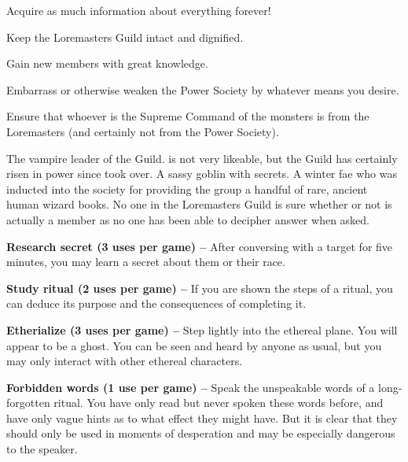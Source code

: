 \documentclass[blue]{guildcamp2}
\begin{document}
\begin{itemz}[Goals]
  \item Acquire as much information about everything forever!
  \item Keep the Loremasters Guild intact and dignified.
  \item Gain new members with great knowledge.
  \item Embarrass or otherwise weaken the Power Society by whatever means you desire.
  \item Ensure that whoever is the Supreme Command of the monsters is from the Loremasters (and certainly not from the Power Society).
\end{itemz}


\begin{members}
  \member{\cVampire{}} The vampire leader of the Guild. \cVampire{\They} is not very likeable, but the Guild has certainly risen in power since \cVampire{\they} took over.
	\member{\cGoblin{}} A sassy goblin with secrets. 
	\member{\cBabyFae{}} A winter fae who was inducted into the society for providing the group a handful of rare, ancient human wizard books.
	\member{\cSphinx{}} No one in the Loremasters Guild is sure whether or not \cSphinx{} is actually a member as no one has been able to decipher \cSphinx{\their} answer when asked.
	
\end{members}


\begin{itemz}
	\item \textbf{Research secret (3 uses per game) --} After conversing with a target for five minutes, you may learn a secret about them or their race.
	\item \textbf{Study ritual (2 uses per game) --} If you are shown the steps of a ritual, you can deduce its purpose and the consequences of completing it.
	\item \textbf{Etherialize (3 uses per game) --} Step lightly into the ethereal plane. You will appear to be a ghost. You can be seen and heard by anyone as usual, but you may only interact with other ethereal characters.
	\item \textbf{Forbidden words (1 use per game) --} Speak the unspeakable words of a long-forgotten ritual. You have only read but never spoken these words before, and have only vague hints as to what effect they might have. But it is clear that they should only be used in moments of desperation and may be especially dangerous to the speaker.
\end{itemz}
	
\end{document}
